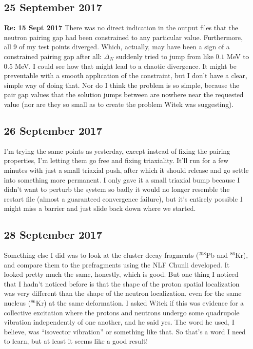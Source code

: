 \documentclass[]{report}
\begin{document}
\subsection*{25 September 2017}
\textbf{Re: 15 Sept 2017} There was no direct indication in the output files that the neutron pairing gap had been constrained to any particular value. Furthermore, all 9 of my test points diverged. Which, actually, may have been a sign of a constrained pairing gap after all: $\Delta_N$ suddenly tried to jump from like $0.1$ MeV to $0.5$ MeV. I could see how that might lead to a chaotic divergence. It might be preventable with a smooth application of the constraint, but I don't have a clear, simple way of doing that. Nor do I think the problem is so simple, because the pair gap values that the solution jumps between are nowhere near the requested value (nor are they so small as to create the problem Witek was suggesting).

\subsection*{26 September 2017}
I'm trying the same points as yesterday, except instead of fixing the pairing properties, I'm letting them go free and fixing triaxiality. It'll run for a few minutes with just a small triaxial push, after which it should release and go  settle into something more permanent. I only gave it a small triaxial bump because I didn't want to perturb the system so badly it would no longer resemble the restart file (almost a guaranteed convergence failure), but it's entirely possible I might miss a barrier and just slide back down where we started.

\subsection*{28 September 2017}
Something else I did was to look at the cluster decay fragments ($^{208}$Pb and $^{86}$Kr), and compare them to the prefragments using the NLF Chunli developed. It looked pretty much the same, honestly, which is good. But one thing I noticed that I hadn't noticed before is that the shape of the proton spatial localization was very different than the shape of the neutron localization, even for the same nucleus ($^{86}$Kr) at the same deformation. I asked Witek if this was evidence for a collective excitation where the protons and neutrons undergo some quadrupole vibration independently of one another, and he said yes. The word he used, I believe, was ``isovector vibration'' or something like that. So that's a word I need to learn, but at least it seems like a good result!
\end{document}
